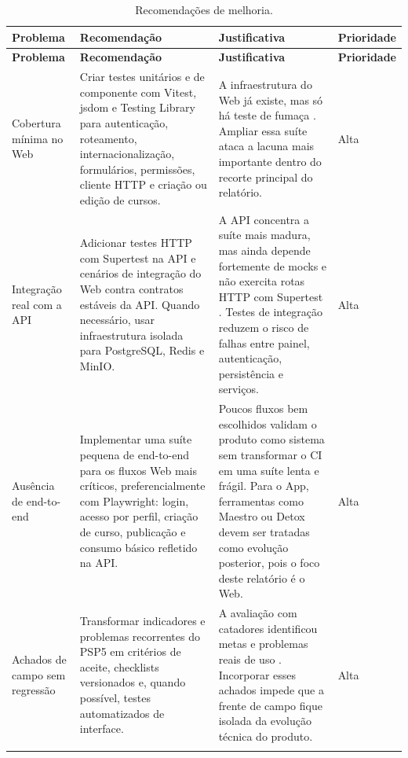 {\footnotesize
\begin{longtable}{>{\raggedright\arraybackslash}p{2.4cm} >{\raggedright\arraybackslash}p{3.8cm} >{\raggedright\arraybackslash}p{4.5cm} >{\raggedright\arraybackslash}p{1.9cm}}
\caption{Recomendações de melhoria.}
\label{tab:recomendacoes}\\
\toprule
\textbf{Problema} & \textbf{Recomendação} & \textbf{Justificativa} & \textbf{Prioridade} \\
\midrule
\endfirsthead

\toprule
\textbf{Problema} & \textbf{Recomendação} & \textbf{Justificativa} & \textbf{Prioridade} \\
\midrule
\endhead

Cobertura mínima no Web
&
Criar testes unitários e de componente com Vitest, jsdom e Testing Library para
autenticação, roteamento, internacionalização, formulários, permissões, cliente
HTTP e criação ou edição de cursos.
&
A infraestrutura do Web já existe, mas só há teste de fumaça
\cite{educado-repos}. Ampliar essa suíte ataca a lacuna mais importante dentro
do recorte principal do relatório.
&
Alta
\\
\addlinespace

Integração real com a API
&
Adicionar testes HTTP com Supertest na API e cenários de integração do Web contra
contratos estáveis da API. Quando necessário, usar infraestrutura isolada para
PostgreSQL, Redis e MinIO.
&
A API concentra a suíte mais madura, mas ainda depende fortemente de mocks e não
exercita rotas HTTP com Supertest \cite{educado-repos}. Testes de integração
reduzem o risco de falhas entre painel, autenticação, persistência e serviços.
&
Alta
\\
\addlinespace

Ausência de end-to-end
&
Implementar uma suíte pequena de end-to-end para os fluxos Web mais críticos,
preferencialmente com Playwright: login, acesso por perfil, criação de curso,
publicação e consumo básico refletido na API.
&
Poucos fluxos bem escolhidos validam o produto como sistema sem transformar o CI
em uma suíte lenta e frágil. Para o App, ferramentas como Maestro ou Detox devem
ser tratadas como evolução posterior, pois o foco deste relatório é o Web.
&
Alta
\\
\addlinespace

Achados de campo sem regressão
&
Transformar indicadores e problemas recorrentes do PSP5 em critérios de aceite,
checklists versionados e, quando possível, testes automatizados de interface.
&
A avaliação com catadores identificou metas e problemas reais de uso
\cite{psp5,dashboard}. Incorporar esses achados impede que a frente de campo
fique isolada da evolução técnica do produto.
&
Alta
\\
\addlinespace


\end{longtable}}
